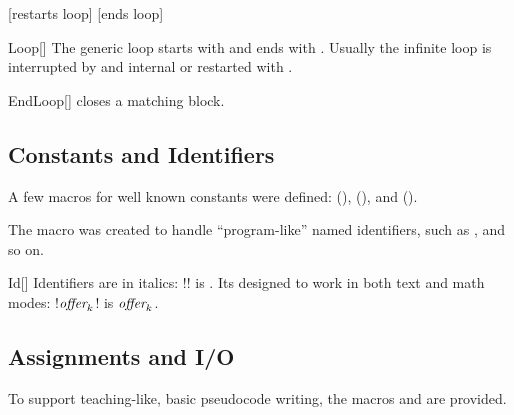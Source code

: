 \documentclass[a4paper, 11pt]{article}
\begin{document}
\begin{tcblisting}{}
    \begin{algorithmic}
        \Loop
                \Statep{\Continue}[restarts loop]
            \EndIf
                \Statep{\Break}[ends loop]
            \EndIf
        \EndLoop
    \end{algorithmic}
\end{tcblisting}

\begin{macro}{Loop}[]
    The generic loop starts with  and ends with . Usually the infinite loop is interrupted by and internal  or restarted with .

    \BlockOptionsText
\end{macro}

\begin{macro}{EndLoop}[]
     closes a matching  block.

    \MacroOptionsText
\end{macro}

\subsection{Constants and Identifiers}\label{sec:constants-and-identifiers}
A few macros for well known constants were defined:  (\True),  (\False), and  (\Nil).

The macro  was created to handle ``program-like'' named identifiers, such as ,  and so on.

\begin{macro}{Id}[]
    Identifiers are in italics: \latexinline!! is . Its designed to work in both text and math modes: \latexinline!$\textit{\rmfamily offer}_k$! is $\textit{\rmfamily offer}_k$.
\end{macro}

\subsection{Assignments and I/O}\label{sec:assignments-and-i/o}

To support teaching-like, basic pseudocode writing, the macros  and  are provided.
\end{document}
